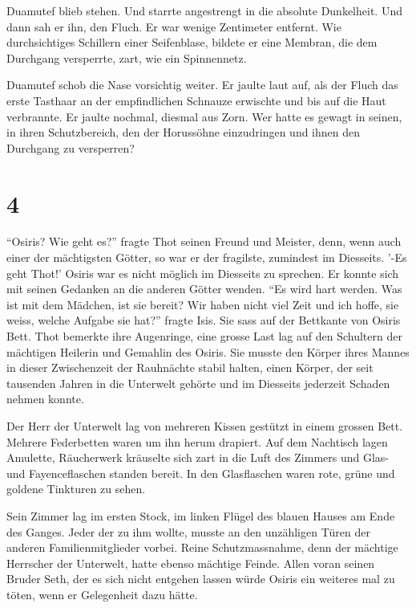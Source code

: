 \documentclass[11pt,titlepage,a5paper]{book}
\begin{document}
Duamutef blieb stehen. Und starrte angestrengt in die absolute Dunkelheit. Und dann sah er ihn, den Fluch. Er war wenige Zentimeter entfernt. Wie durchsichtiges Schillern einer Seifenblase, bildete er eine Membran, die dem Durchgang versperrte, zart, wie ein Spinnennetz.

Duamutef schob die Nase vorsichtig weiter. Er jaulte laut auf, als der Fluch das erste Tasthaar an der empfindlichen Schnauze erwischte und bis auf die Haut verbrannte. Er jaulte nochmal, diesmal aus Zorn. Wer hatte es gewagt in seinen, in ihren Schutzbereich, den der Horussöhne einzudringen und ihnen den Durchgang zu versperren?

\section*{4}


"`Osiris? Wie geht es?"' fragte Thot seinen Freund und Meister, denn, wenn auch einer der mächtigsten Götter, so war er der fragilste, zumindest im Diesseits. '-Es geht Thot!' Osiris war es nicht möglich im Diesseits zu sprechen. Er konnte sich mit seinen Gedanken an die anderen Götter wenden.  "`Es wird hart werden. Was ist mit dem Mädchen, ist sie bereit? Wir haben nicht viel Zeit und ich hoffe, sie weiss, welche Aufgabe sie hat?"'  fragte Isis. Sie sass auf der Bettkante von Osiris Bett. Thot bemerkte ihre Augenringe, eine grosse Last lag auf den Schultern der mächtigen Heilerin und Gemahlin des Osiris. Sie musste den Körper ihres Mannes in dieser Zwischenzeit der Rauhnächte stabil halten, einen Körper, der seit tausenden Jahren in die Unterwelt gehörte und im Diesseits jederzeit Schaden nehmen konnte. 

Der Herr der Unterwelt lag von mehreren Kissen gestützt in einem grossen Bett. Mehrere Federbetten waren um ihn herum drapiert. Auf dem Nachtisch lagen Amulette, Räucherwerk kräuselte sich zart in die Luft des Zimmers und Glas- und Fayenceflaschen standen bereit. In den Glasflaschen waren rote, grüne und goldene Tinkturen zu sehen. 

Sein Zimmer lag im ersten Stock, im linken Flügel des blauen Hauses am Ende des Ganges. Jeder der zu ihm wollte, musste an den unzähligen Türen der anderen Familienmitglieder vorbei. Reine Schutzmassnahme, denn der mächtige Herrscher der Unterwelt, hatte ebenso mächtige Feinde. Allen voran seinen Bruder Seth, der es sich nicht entgehen lassen würde Osiris ein weiteres mal zu töten, wenn er Gelegenheit dazu hätte. 
\end{document}
